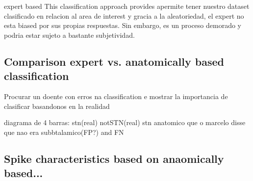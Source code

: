 expert based  This classification approach provides apermite tener nuestro dataset clasificado en relacion al area de interest y gracia a la aleatoriedad, el expert no esta biased por sus propias respuestas. Sin embargo, es un proceso demorado y podria estar sujeto a bastante subjetividad.

\subsection{Comparison expert vs. anatomically based classification}
Procurar un doente con erros na classification e mostrar la importancia de clasificar basandonos en la realidad

diagrama de 4 barras: stn(real) notSTN(real) stn anatomico que o marcelo disse que nao era subbtalamico(FP?) and FN

\subsection{Spike characteristics based on anaomically based...}

